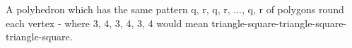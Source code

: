 A polyhedron which has the same pattern {q, r, q, r, ..., q, r} of polygons
round each vertex - where {3, 4, 3, 4, 3, 4} would mean 
triangle-square-triangle-square-triangle-square.